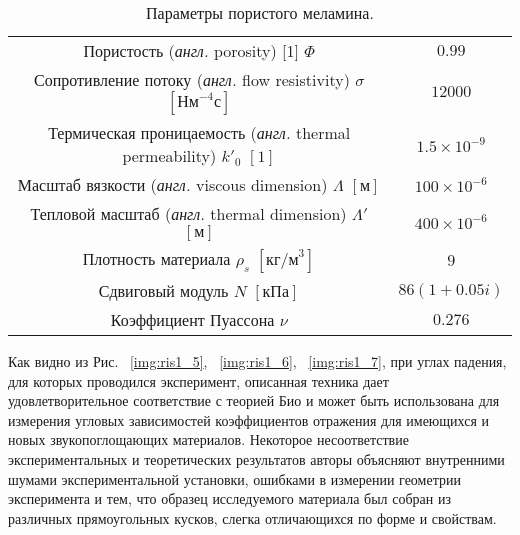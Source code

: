 \begin{table}
	\label{tabular:melamine}
	\begin{center}
		\begin{tabular}{cc}
			Пористость (\textit{англ.} porosity) [1] $\Phi$ & $0.99$ \\
			Сопротивление потоку (\textit{англ.} flow resistivity) $\sigma$ $[\text{Нм}^{-4} с]$ & $12000$ \\
			Термическая проницаемость (\textit{англ.} thermal permeability) $k'_0$ $[1]$ & $1.5 \times 10^{-9}$\\
			Масштаб вязкости (\textit{англ.} viscous dimension) $\Lambda$ $[\text{м}]$ & $100\times 10^{-6}$ \\	
			Тепловой масштаб (\textit{англ.} thermal dimension) $\Lambda'$ $[\text{м}]$ & $400\times 10^{-6}$\\
			Плотность материала $\rho_s$ $[\text{кг/м}^3]$ & $9$\\
			Сдвиговый модуль $N$ $[\text{кПа}]$ & $86(1 + 0.05i)$\\
			Коэффициент Пуассона $\nu$ & $0.276$
		\end{tabular}
	\end{center}
	\caption{Параметры пористого меламина.}
\end{table}

Как видно из Рис. ~\eqref{img:ris1_5}, ~\eqref{img:ris1_6}, ~\eqref{img:ris1_7}, при углах падения, для которых проводился эксперимент, описанная техника дает удовлетворительное соответствие с теорией Био и может быть использована для измерения угловых зависимостей коэффициентов отражения для имеющихся и новых звукопоглощающих материалов. Некоторое несоответствие экспериментальных и теоретических результатов авторы объясняют внутренними шумами экспериментальной установки, ошибками в измерении геометрии эксперимента и тем, что образец исследуемого материала был собран из различных прямоугольных кусков, слегка отличающихся по форме и свойствам.
